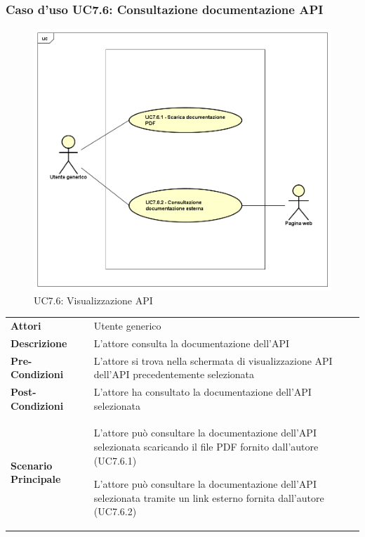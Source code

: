 \newpage
\subsubsection{Caso d'uso UC7.6: Consultazione documentazione API}
\label{UC7_6}
\begin{figure}[ht]
	\centering
	\includegraphics[scale=0.45]{UML/UC7_6.png}
	\caption{UC7.6: Visualizzazione API}
\end{figure}

\begin{minipage}{\linewidth}
	\begin{tabular}{ l | p{11cm}}
		\hline
		\rowcolor{Gray}
		\multicolumn{2}{c}{UC7.6 - Consultazione documentazione API} \\
		\hline
		\textbf{Attori} & Utente generico \\
		\textbf{Descrizione} & L'attore consulta la documentazione dell'API \\
		\textbf{Pre-Condizioni} & L'attore si trova nella schermata di visualizzazione API dell'API precedentemente selezionata \\
		\textbf{Post-Condizioni} & L'attore ha consultato la documentazione dell'API selezionata \\
		\textbf{Scenario Principale} & 
		\begin{enumerate*}[label=(\arabic*.),itemjoin={\newline}]
			\item L'attore può consultare la documentazione dell'API selezionata scaricando il file PDF fornito dall'autore (UC7.6.1)
			\item L'attore può consultare la documentazione dell'API selezionata tramite un link esterno fornita dall'autore (UC7.6.2)
		\end{enumerate*}\\
	\end{tabular}
\end{minipage}

